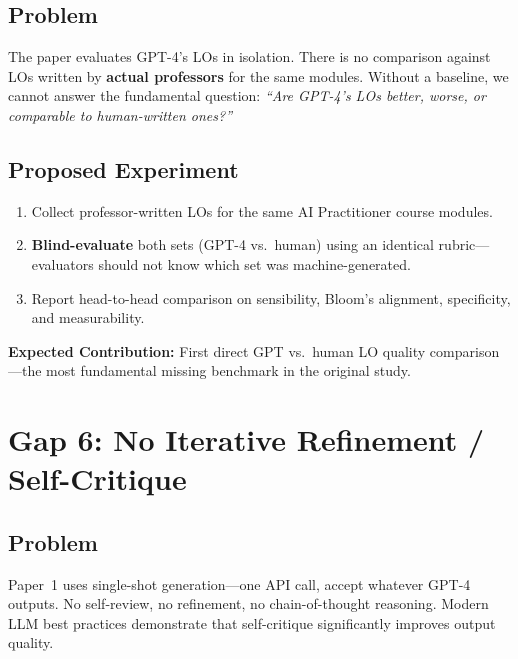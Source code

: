 \documentclass[11pt,a4paper]{article}
\begin{document}
\subsection{Problem}
The paper evaluates GPT-4's LOs in isolation. There is no comparison against LOs written by \textbf{actual professors} for the same modules. Without a baseline, we cannot answer the fundamental question: \textit{``Are GPT-4's LOs better, worse, or comparable to human-written ones?''}

\subsection{Proposed Experiment}
\begin{enumerate}[nosep]
    \item Collect professor-written LOs for the same AI Practitioner course modules.
    \item \textbf{Blind-evaluate} both sets (GPT-4 vs.\ human) using an identical rubric---evaluators should not know which set was machine-generated.
    \item Report head-to-head comparison on sensibility, Bloom's alignment, specificity, and measurability.
\end{enumerate}

\begin{notebox}
\textbf{Expected Contribution:} First direct GPT vs.\ human LO quality comparison---the most fundamental missing benchmark in the original study.
\end{notebox}

\section{Gap 6: No Iterative Refinement / Self-Critique}

\subsection{Problem}
Paper~1 uses single-shot generation---one API call, accept whatever GPT-4 outputs. No self-review, no refinement, no chain-of-thought reasoning. Modern LLM best practices demonstrate that self-critique significantly improves output quality.
\end{document}
